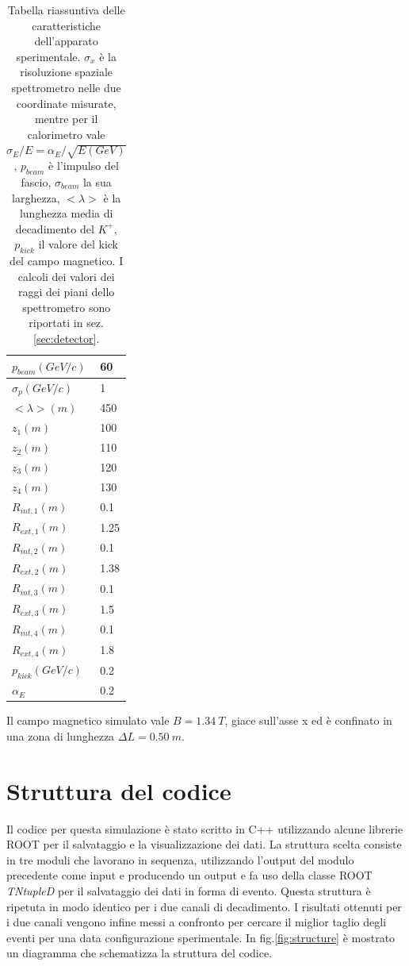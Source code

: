 \documentclass[8pt]{extarticle}
\begin{document}
\begin{table}[h!]
\centering
\begin{tabular}{|p{2.5 cm}| p{1 cm}|}
\hline\hline
$p_{beam} (GeV/c)$ & 60 \\
\hline
$\sigma_p (GeV/c)$ & 1 \\
\hline
$<\lambda> (m)$ & 450 \\
\hline
$z_1 (m)$ & 100 \\
\hline
$z_2 (m)$ & 110 \\
\hline
$z_3 (m)$ & 120 \\
\hline
$z_4 (m)$ & 130 \\
\hline
$R_{int,1} (m)$ & 0.1 \\
\hline
$R_{ext,1} (m)$ & 1.25 \\
\hline
$R_{int,2} (m)$ & 0.1 \\
\hline
$R_{ext,2} (m)$ & 1.38 \\
\hline
$R_{int,3} (m)$ & 0.1 \\
\hline
$R_{ext,3} (m)$ & 1.5 \\
\hline
$R_{int,4} (m)$ & 0.1 \\
\hline
$R_{ext,4} (m)$ & 1.8 \\
\hline
$p_{kick} (GeV/c)$ & 0.2 \\
\hline
$\alpha_E$ & 0.2 \\
\hline \hline
\end{tabular}
\caption{Tabella riassuntiva delle caratteristiche dell'apparato sperimentale. $\sigma_x$ è la risoluzione spaziale spettrometro nelle due coordinate misurate, mentre per il calorimetro vale $\sigma_E/E = \alpha_E/\sqrt{E(GeV)}$, $p_{beam}$ è l'impulso del fascio, $\sigma_{beam}$ la sua larghezza, $<\lambda>$ è la lunghezza media di decadimento del $K^+$, $p_{kick}$ il valore del kick del campo magnetico. I calcoli dei valori dei raggi dei piani dello spettrometro sono riportati in sez.\ref{sec:detector}.}
\label{tab:apparato}
\end{table}

Il campo magnetico simulato vale $B = 1.34\ T$, giace sull'asse x ed è confinato in una zona di lunghezza $\Delta L = 0.50\ m$.

\newpage

\section{Struttura del codice} \label{sec:struttura}
Il codice per questa simulazione è stato scritto in C++ utilizzando alcune librerie ROOT per il salvataggio e la visualizzazione dei dati. 
La struttura scelta consiste in tre moduli che lavorano in sequenza, utilizzando l'output del modulo precedente come input e producendo un output e fa uso della classe ROOT \textit{TNtupleD} per il salvataggio dei dati in forma di evento. Questa struttura è ripetuta in modo identico per i due canali di decadimento. I risultati ottenuti per i due canali vengono infine messi a confronto per cercare il miglior taglio degli eventi per una data configurazione sperimentale. In fig.\ref{fig:structure} è mostrato un diagramma che schematizza la struttura del codice. 
\end{document}
